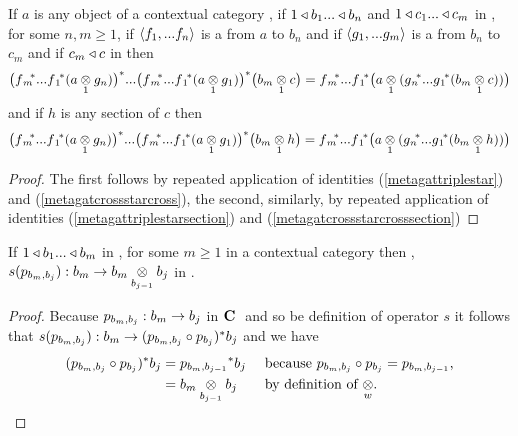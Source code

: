 \begin{lemma}
If $a$ is any object of a contextual category \catcw, if $1 \base b_1 ... \base b_n$ and $1 \base c_1 ... \base c_m$ in \catc, for some $n,m \ge 1$, 
if $\tuple{\fn}$ is a  from $a$ to $b_n$ and
if $\tuple{\gm}$ is a  from $b_n$ to $c_m$ and if  $c_m \base c$ in \catcw then
\begin{equation}
\big(\fmvectorstar (\crossx{a}{g_n}{1})\big)^* ... \big(\fmvectorstar (\crossx{a}{g_1}{1})\big) ^* \big(\crossx{b_m}{c}{1}\big) 
= \fmvectorstar \big(  \crossx{a}{(\gnvectorstar(\crossx{b_m}{c}{1}))}{1} \big)                                    
\end{equation}
and if  $h$ is any section of $c$ then 
\begin{equation}
\big(\fmvectorstar (\crossx{a}{g_n}{1})\big)^* ... \big(\fmvectorstar (\crossx{a}{g_1}{1})\big) ^* \big(\crossx{b_m}{h}{1}\big) 
= \fmvectorstar \big(  \crossx{a}{(\gnvectorstar(\crossx{b_m}{h}{1}))}{1} \big)                                    
\end{equation}
\end{lemma}
\begin{proof}
The first follows by repeated application of identities (\ref{metagattriplestar}) and (\ref{metagatcrossstarcross}), 
the second, similarly, by repeated application of identities (\ref{metagattriplestarsection}) and (\ref{metagatcrossstarcrosssection})
\end{proof}

\begin{lemma}
If $1 \base b_1 ... \base b_m$ in \catc, for some $m \ge 1$ in a contextual category \catc then \foreachj,
$s(p_{b_m,b_j}): b_m \morph \crossx{b_m}{b_j}{b_{j-1}}$ in \catcw.
\end{lemma}
\begin{proof}
Because $p_{b_m,b_j}: b_m \morph b_j$ in $\catcw$ and so be definition of operator $s$ it follows that $s(p_{b_m,b_j}): b_m  \morph (p_{b_m,b_j} \circ p_{b_j})^*b_j$
and we have 
\begin{align*}
(p_{b_m,b_j} \circ p_{b_j})^*b_j &= {p_{b_m,b_{j-1}}} ^* b_j  && \mbox{ because $p_{b_m,b_j} \circ p_{b_j}=p_{b_m,b_{j-1}}$,} \\
                                 &= \crossx{b_m}{b_j}{b_{j-1}} && \mbox{ by definition of $\crossx{}{}{w}$}.
\end{align*}
\end{proof}

